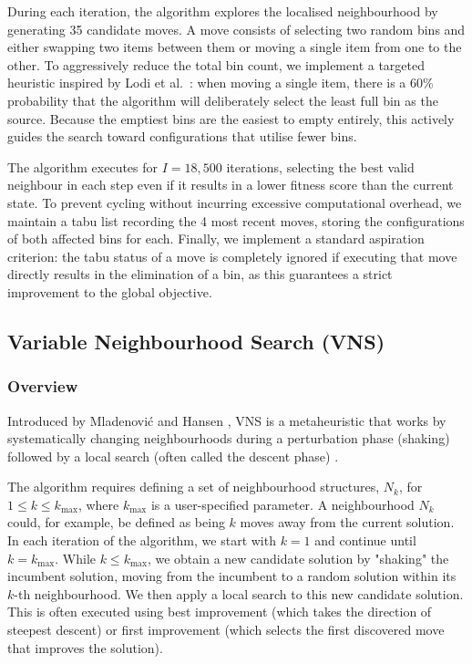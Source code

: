 \documentclass[11pt]{article}
\begin{document}
During each iteration, the algorithm explores the localised neighbourhood by 
generating 35 candidate moves. A move consists of selecting two random bins 
and either swapping two items between them or moving a single item from one 
to the other. To aggressively reduce the total bin count, we implement a 
targeted heuristic inspired by Lodi et al.\ \cite{lodi}: when moving a 
single item, there is a 60\% probability that the algorithm will deliberately 
select the least full bin as the source. Because the emptiest bins are the 
easiest to empty entirely, this actively guides the search toward 
configurations that utilise fewer bins.

The algorithm executes for $I = 18{,}500$ iterations, selecting the best 
valid neighbour in each step even if it results in a lower fitness score than 
the current state. To prevent cycling without incurring excessive 
computational overhead, we maintain a tabu list recording the 4 most recent 
moves, storing the configurations of both affected bins for each. Finally, we 
implement a standard aspiration criterion: the tabu status of a move is 
completely ignored if executing that move directly results in the elimination 
of a bin, as this guarantees a strict improvement to the global objective.

\subsection{Variable Neighbourhood Search (VNS)}

\subsubsection{Overview}
Introduced by Mladenović and Hansen \cite{mladenovic}, VNS is a metaheuristic that works by systematically changing neighbourhoods during a perturbation phase (shaking) followed by a local search (often called the descent phase) \cite{gendreau}. 

The algorithm requires defining a set of neighbourhood structures, $N_{k}$, for $1 \le k \le k_{\max}$, where $k_{\max}$ is a user-specified parameter. A neighbourhood $N_{k}$ could, for example, be defined as being $k$ moves away from the current solution. In each iteration of the algorithm, we start with $k = 1$ and continue until $k = k_{\max}$. While $k \le k_{\max}$, we obtain a new candidate solution by "shaking" the incumbent solution, moving from the incumbent to a random solution within its $k$-th neighbourhood. We then apply a local search to this new candidate solution. This is often executed using best improvement (which takes the direction of steepest descent) or first improvement (which selects the first discovered move that improves the solution). 
\end{document}
